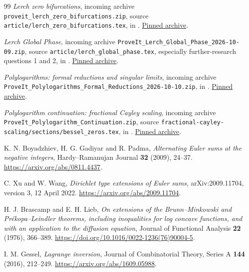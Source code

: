 \begin{thebibliography}{99}
\emph{Lerch zero bifurcations},
incoming archive \nolinkurl{proveit_lerch_zero_bifurcations.zip},
source \nolinkurl{article/lerch_zero_bifurcations.tex}, in \cite{Project}.
\href{https://github.com/VladimirReshetnikov/ProveIt/blob/a0a90ef31877f98be437191c48b46f02d5456867/docs/incoming/proveit_lerch_zero_bifurcations.zip}{Pinned archive}.

\emph{Lerch Global Phase},
incoming archive \nolinkurl{ProveIt_Lerch_Global_Phase_2026-10-09.zip},
source \nolinkurl{article/lerch_global_phase.tex},
especially further-research questions 1 and 2, in \cite{Project}.
\href{https://github.com/VladimirReshetnikov/ProveIt/blob/a0a90ef31877f98be437191c48b46f02d5456867/docs/incoming/ProveIt_Lerch_Global_Phase_2026-10-09.zip}{Pinned archive}.

\emph{Polylogarithms: formal reductions and singular limits},
incoming archive
\nolinkurl{ProveIt_Polylogarithms_Formal_Reductions_2026-10-10.zip},
in \cite{Project}.
\href{https://github.com/VladimirReshetnikov/ProveIt/blob/a0a90ef31877f98be437191c48b46f02d5456867/docs/incoming/ProveIt_Polylogarithms_Formal_Reductions_2026-10-10.zip}{Pinned archive}.

\emph{Polylogarithm continuation: fractional Cayley scaling},
incoming archive \nolinkurl{ProveIt_Polylogarithm_Continuation.zip},
source \nolinkurl{fractional-cayley-scaling/sections/bessel_zeros.tex},
in \cite{Project}.
\href{https://github.com/VladimirReshetnikov/ProveIt/blob/a0a90ef31877f98be437191c48b46f02d5456867/docs/incoming/ProveIt_Polylogarithm_Continuation.zip}{Pinned archive}.

K. N. Boyadzhiev, H. G. Gadiyar and R. Padma,
\emph{Alternating Euler sums at the negative integers},
Hardy--Ramanujan Journal \textbf{32} (2009), 24--37.
\url{https://arxiv.org/abs/0811.4437}.

C. Xu and W. Wang,
\emph{Dirichlet type extensions of Euler sums},
arXiv:2009.11704, version 3, 12 April 2022.
\url{https://arxiv.org/abs/2009.11704}.

H. J. Brascamp and E. H. Lieb,
\emph{On extensions of the Brunn--Minkowski and Pr\'ekopa--Leindler
theorems, including inequalities for log concave functions, and with
an application to the diffusion equation},
Journal of Functional Analysis \textbf{22} (1976), 366--389.
\url{https://doi.org/10.1016/0022-1236(76)90004-5}.

I. M. Gessel, \emph{Lagrange inversion},
Journal of Combinatorial Theory, Series A \textbf{144} (2016), 212--249.
\url{https://arxiv.org/abs/1609.05988}.


\end{thebibliography}
